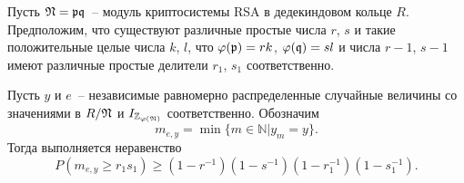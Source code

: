 \documentclass[_00_dissertation.tex]{subfiles}
\begin{document}
\begin{theorem}\label{theorem:iterated}
    Пусть $\mathfrak{N} = \mathfrak{p} \mathfrak{q}$~-- модуль криптосистемы RSA в дедекиндовом кольце $R$.
    Предположим, что существуют различные простые числа $r$, $s$ и такие положительные целые числа $k$, $l$, что $\varphi(\mathfrak{p}) = rk$, $\varphi(\mathfrak{q}) = sl$ и числа $r - 1$, $s - 1$ имеют различные простые делители $r_1$, $s_1$ соответственно.

    Пусть $y$ и $e$~-- независимые равномерно распределенные случайные величины со значениями в $R / \mathfrak{N}$ и $I_{\mathbb{Z}_{\varphi(\mathfrak{N})}}$ соответственно.
    Обозначим
    \begin{equation*}
        m_{e,y} = \min \{m \in \mathbb{N} | y_m = y\}.
    \end{equation*}
    Тогда выполняется неравенство
    \begin{equation*}
        P(m_{e,y} \ge r_1s_1)\ge(1-r^{-1})(1-s^{-1})(1-r_1^{-1})(1-s_1^{-1}).
    \end{equation*}
\end{theorem}
\end{document}
